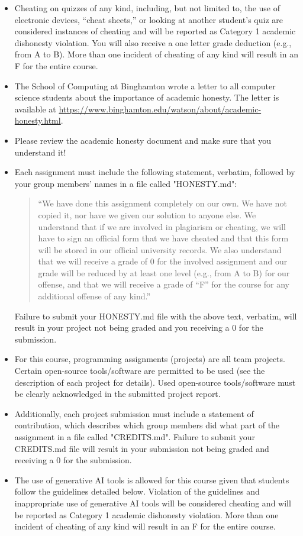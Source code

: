 \documentclass[11pt,article,oneside]{memoir} %
\begin{document}
\begin{itemize}
    \item Cheating on quizzes of any kind, including, but not limited to, the use of electronic devices, ``cheat sheets,'' or looking at another student's quiz are considered instances of cheating and will be reported as Category 1 academic dishonesty violation. You will also receive a one letter grade deduction (e.g., from A to B). More than one incident of cheating of any kind will result in an F for the entire course.
    \item The School of Computing at Binghamton wrote a letter to all computer science students about the importance of academic honesty. The letter is available at \url{https://www.binghamton.edu/watson/about/academic-honesty.html}.
    \item Please review the academic honesty document and make sure that you understand it!
    \item Each assignment must include the following statement, verbatim, followed by your group members' names in a file called "HONESTY.md":
    \begin{quote}
        ``We have done this assignment completely on our own. We have not copied it, nor have we given our solution to anyone else. We understand that if we are involved in plagiarism or cheating, we will have to sign an official form that we have cheated and that this form will be stored in our official university records. We also understand that we will receive a grade of 0 for the involved assignment and our grade will be reduced by at least one level (e.g., from A to B) for our offense, and that we will receive a grade of ``F'' for the course for any additional offense of any kind.''
    \end{quote}
    Failure to submit your HONESTY.md file with the above text, verbatim, will result in your project not being graded and you receiving a 0 for the submission.
    \item For this course, programming assignments (projects) are all team projects. Certain open-source tools/software are permitted to be used (see the description of each project for details). Used open-source tools/software must be clearly acknowledged in the submitted project report.
    \item Additionally, each project submission must include a statement of contribution, which describes which group members did what part of the assignment in a file called "CREDITS.md". Failure to submit your CREDITS.md file will result in your submission not being graded and receiving a 0 for the submission.
    \item The use of generative AI tools is allowed for this course given that students follow the guidelines detailed below.
    Violation of the guidelines and inappropriate use of generative AI tools will be considered cheating and will be reported as Category 1 academic dishonesty violation.
    More than one incident of cheating of any kind will result in an F for the entire course.
\end{itemize}
\end{document}
